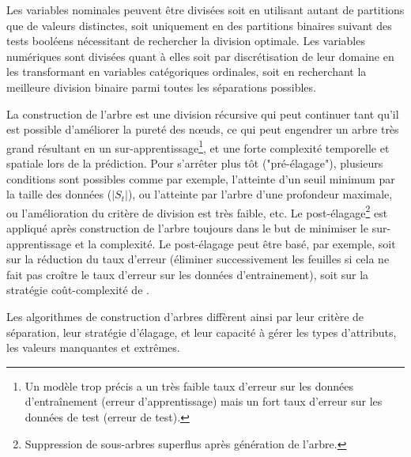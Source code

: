 Les variables nominales peuvent être divisées soit en utilisant autant de partitions que de valeurs distinctes, soit uniquement en des partitions binaires suivant des tests booléens nécessitant de rechercher la division optimale. Les variables numériques sont divisées quant à elles soit par discrétisation de leur domaine en les transformant en variables catégoriques ordinales, soit en recherchant la meilleure division binaire parmi toutes les séparations possibles. 

La construction de l'arbre est une division récursive qui peut continuer tant qu'il est possible d'améliorer la pureté des nœuds, ce qui peut engendrer un arbre très grand résultant en un sur-apprentissage\footnote{Un modèle trop précis a un très faible taux d'erreur sur les données d'entraînement (erreur d'apprentissage) mais un fort taux d'erreur sur les données de test (erreur de test).}, et une forte complexité temporelle et spatiale lors de la prédiction. Pour s'arrêter plus tôt ("pré-élagage"), plusieurs conditions sont possibles comme par exemple, l'atteinte d'un seuil minimum par la taille des données ($\vert S_t \vert$), ou l'atteinte par l'arbre d'une profondeur maximale, ou l'amélioration du critère de division est très faible, etc. Le post-élagage\footnote{Suppression de sous-arbres superflus après génération de l'arbre.} est appliqué après construction de l'arbre toujours dans le but de minimiser le sur-apprentissage et la complexité. Le post-élagage peut être basé, par exemple, soit sur la réduction du taux d'erreur (éliminer successivement les feuilles si cela ne fait pas croître le taux d'erreur sur les données d'entrainement), soit sur la stratégie coût-complexité de \citet{Breiman1984CART}. %

Les algorithmes de construction d'arbres diffèrent ainsi par leur critère de séparation, leur stratégie d'élagage, et leur capacité à gérer les types d'attributs, les valeurs manquantes et extrêmes. %

